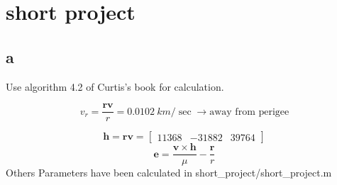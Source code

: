 \section{short project}
\subsection{a}
Use algorithm 4.2 of Curtis's book for calculation.

$$
v_r = \dfrac{\boldsymbol r \boldsymbol v}{r} =  0.0102 ~km /\sec \to \text{away from perigee}
$$

$$
\boldsymbol h = \boldsymbol r \boldsymbol v = \begin{bmatrix}
    11368 &  -31882  &  39764
\end{bmatrix}
$$
$$
\boldsymbol e = \dfrac{\boldsymbol v \times \boldsymbol h}{\mu} - \dfrac{\boldsymbol r}{r}
$$
Others Parameters have been calculated in short\_project/short\_project.m



